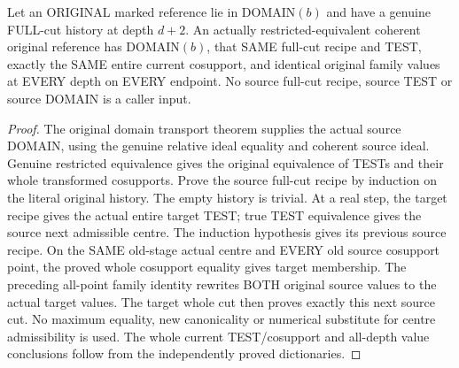 \begin{theorem}
\label{hir:original-restricted-equivalence-full-cut-reference-transport}
\leanok
Let an ORIGINAL marked reference lie in DOMAIN$(b)$ and have a genuine
FULL-cut history at depth $d+2$. An actually restricted-equivalent coherent
original reference has DOMAIN$(b)$, that SAME full-cut recipe and TEST,
exactly the SAME entire current cosupport, and identical original family
values at EVERY depth on EVERY endpoint. No source full-cut recipe, source
TEST or source DOMAIN is a caller input.
\end{theorem}
\begin{proof}
The original domain transport theorem supplies the actual source DOMAIN,
using the genuine relative ideal equality and coherent source ideal.
Genuine restricted equivalence gives the original equivalence of TESTs
and their whole transformed cosupports. Prove the source full-cut recipe
by induction on the literal original history. The empty history is
trivial. At a real step, the target recipe gives the actual entire target
TEST; true TEST equivalence gives the source next admissible centre.
The induction hypothesis gives its previous source recipe. On the SAME
old-stage actual centre and EVERY old source cosupport point, the proved
whole cosupport equality gives target membership. The preceding all-point
family identity rewrites BOTH original source values to the actual target
values. The target whole cut then proves exactly this next source cut.
No maximum equality, new canonicality or numerical substitute for centre
admissibility is used. The whole current TEST/cosupport and all-depth
value conclusions follow from the independently proved dictionaries.
\end{proof}


